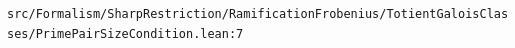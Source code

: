 \nolinkurl{src/Formalism/SharpRestriction/RamificationFrobenius/TotientGaloisClasses/PrimePairSizeCondition.lean:7}%
